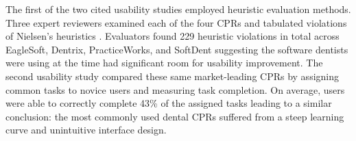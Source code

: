 \documentclass[11pt]{article}
\begin{document}
The first of the two cited usability studies employed heuristic evaluation methods\cite{Nielsen1994Usability-Inspe}. Three expert reviewers examined each of the four CPRs and tabulated violations of Nielsen's heuristics \cite{Thyvalikakath:2009fk}. Evaluators found 229 heuristic violations in total across EagleSoft, Dentrix, PracticeWorks, and SoftDent suggesting the software dentists were using at the time had significant room for usability improvement. The second usability study compared\cite{Nielsen1994Enhancing-the-e} these same market-leading CPRs by assigning common tasks to novice users and measuring task completion. On average, users were able to correctly complete 43\% of the assigned tasks leading to a similar conclusion: the most commonly used dental CPRs suffered from a steep learning curve and unintuitive interface design.
\end{document}
